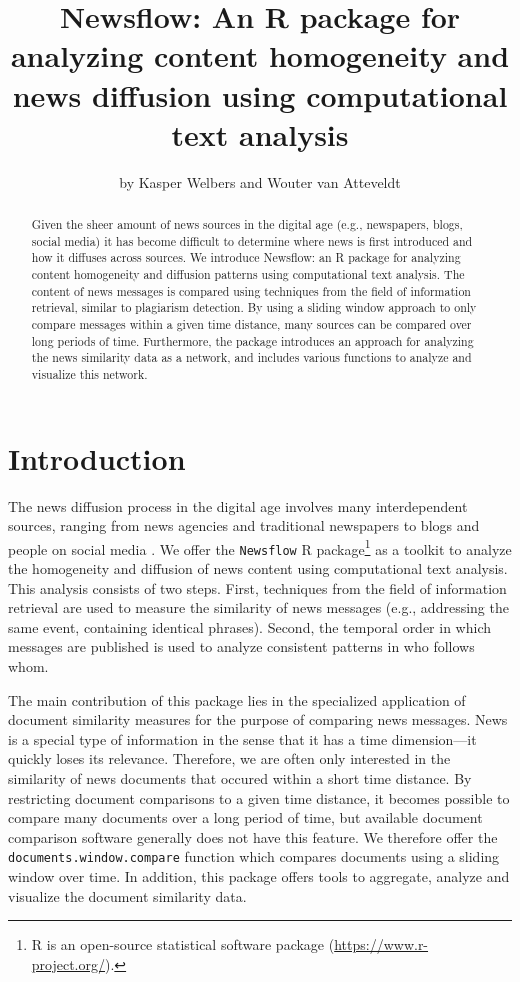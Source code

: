 \documentclass[]{article}
\title{Newsflow: An R package for analyzing content homogeneity and news
diffusion using computational text analysis}
\author{by Kasper Welbers and Wouter van Atteveldt}
\date{}
\let\rmarkdownfootnote\footnote%
\def\footnote{\protect\rmarkdownfootnote}
\begin{document}
\maketitle

\begin{abstract}
Given the sheer amount of news sources in the digital age (e.g.,
newspapers, blogs, social media) it has become difficult to determine
where news is first introduced and how it diffuses across sources. We
introduce Newsflow: an R package for analyzing content homogeneity and
diffusion patterns using computational text analysis. The content of
news messages is compared using techniques from the field of information
retrieval, similar to plagiarism detection. By using a sliding window
approach to only compare messages within a given time distance, many
sources can be compared over long periods of time. Furthermore, the
package introduces an approach for analyzing the news similarity data as
a network, and includes various functions to analyze and visualize this
network.
\end{abstract}

\section{Introduction}\label{introduction}

The news diffusion process in the digital age involves many
interdependent sources, ranging from news agencies and traditional
newspapers to blogs and people on social media
\citep{meraz11, paterson05, pew10}. We offer the \texttt{Newsflow} R
package\footnote{R is an open-source statistical software package
  (\url{https://www.r-project.org/}).} as a toolkit to analyze the
homogeneity and diffusion of news content using computational text
analysis. This analysis consists of two steps. First, techniques from
the field of information retrieval are used to measure the similarity of
news messages (e.g., addressing the same event, containing identical
phrases). Second, the temporal order in which messages are published is
used to analyze consistent patterns in who follows whom.

The main contribution of this package lies in the specialized
application of document similarity measures for the purpose of comparing
news messages. News is a special type of information in the sense that
it has a time dimension---it quickly loses its relevance. Therefore, we
are often only interested in the similarity of news documents that
occured within a short time distance. By restricting document
comparisons to a given time distance, it becomes possible to compare
many documents over a long period of time, but available document
comparison software generally does not have this feature. We therefore
offer the \texttt{documents.window.compare} function which compares
documents using a sliding window over time. In addition, this package
offers tools to aggregate, analyze and visualize the document similarity
data.
\end{document}
